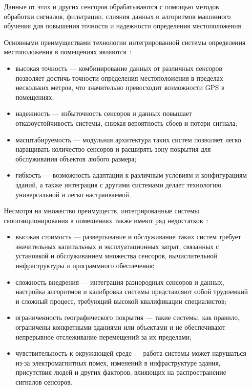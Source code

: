 Данные от этих и других сенсоров обрабатываются с помощью методов обработки сигналов, фильтрации, слияния данных и алгоритмов машинного обучения для повышения точности и надежности определения местоположения.

Основными преимуществами технологии интегрированной системы определения местоположения в помещениях являются~\cite{multsensors}:

\begin{itemize}[label=---]
    \item высокая точность --- комбинирование данных от различных сенсоров позволяет достичь точности определения местоположения в пределах нескольких метров, что значительно превосходит возможности GPS в помещениях;
    \item надежность --- избыточность сенсоров и данных повышает отказоустойчивость системы, снижая вероятность сбоев и потери сигнала;
    \item масштабируемость --- модульная архитектура таких систем позволяет легко наращивать количество сенсоров и расширять зону покрытия для обслуживания объектов любого размера;
    \item гибкость --- возможность адаптации к различным условиям и конфигурациям зданий, а также интеграция с другими системами делает технологию универсальной и легко настраиваемой.
\end{itemize}

Несмотря на множество преимуществ, интегрированные системы геопозиционирования в помещениях также имеют ряд недостатков~\cite{multsensors}:

\begin{itemize}[label=---]
    \item высокая стоимость --- развертывание и обслуживание таких систем требует значительных капитальных и эксплуатационных затрат, связанных с установкой и обслуживанием множества сенсоров, вычислительной инфраструктуры и программного обеспечения;
    \item сложность внедрения --- интеграция разнородных сенсоров и данных, настройка алгоритмов и калибровка системы представляют собой трудоемкий и сложный процесс, требующий высокой квалификации специалистов;
    \item ограниченность географического покрытия --- такие системы, как правило, ограничены конкретными зданиями или объектами и не обеспечивают непрерывное отслеживание перемещений за их пределами;
    \item чувствительность к окружающей среде --- работа системы может нарушаться из-за электромагнитных помех, изменений в инфраструктуре здания, присутствия людей и других факторов, влияющих на распространение сигналов сенсоров.
\end{itemize}

